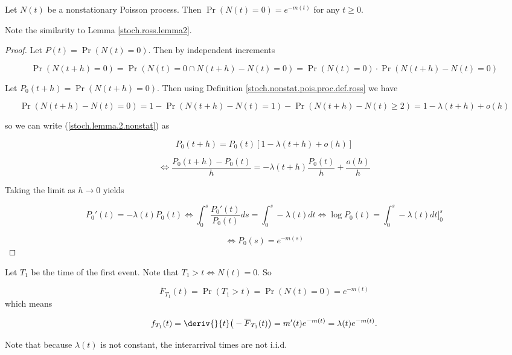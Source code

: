 \begin{lemma}\label{stoch.ross.nonstat.lemma2} Let \(N(t)\) be a nonstationary Poisson process. Then \(\Pr(N(t) = 0) =e^{-m(t)} \) for any \(t \geq 0\).

\end{lemma}

\begin{remark}Note the similarity to Lemma \ref{stoch.ross.lemma2}. \end{remark}

\begin{proof} Let \(P(t) = \Pr(N(t) = 0)\). Then by independent increments

\begin{equation}\label{stoch.lemma.2.nonstat}
\Pr(N(t+h) = 0) = \Pr(N(t) = 0 \cap N(t+h) - N(t) = 0) = \Pr(N(t) = 0) \cdot \Pr(N(t+h) - N(t) = 0)
\end{equation}

Let \(P_0(t+h) = \Pr(N(t+h) = 0)\). Then using Definition \ref{stoch.nonstat.pois.proc.def.ross} we have

\[
\Pr(N(t+h) - N(t) = 0 )= 1 - \Pr(N(t+h) - N(t) = 1 ) - \Pr(N(t+h) - N(t) \geq 2 ) = 1 - \lambda(t + h) + o(h)
\] 

so we can write (\ref{stoch.lemma.2.nonstat}) as 

\[
P_0(t+h) = P_0(t) [1 - \lambda(t + h) + o(h)]
\]

\[
\iff \frac{P_0(t+h) - P_0(t)}{h} = - \lambda(t + h) \frac{ P_0(t)}{h} + \frac{o(h)}{h}
\]

Taking the limit as \(h \to 0\) yields

\[
P_0'(t) = - \lambda(t) P_0(t) \iff \int_0^s \frac{P_0'(t)}{P_0(t)} ds = \int_0^s -\lambda(t) dt \iff \log P_0(t) = \int_0^s -\lambda(t) dt\bigg]_0^s
\]

\[
\iff P_0(s) = e^{- m(s)}
\]

\end{proof}

\begin{remark} Let \(T_1\) be the time of the first event. Note that \(T_1 > t \iff N(t) =0\). So 

\[
\overline{F}_{T_1}(t) = \Pr(T_1 > t) = \Pr(N(t) = 0) = e^{-m(t)}
\]
which means

\[
f_{T_1}(t) = \deriv{ }{t} \big( -\overline{F}_{T_1}(t) \big)  =  m'(t) e^{-m(t)} =  \lambda(t) e^{-m(t)}.
\]
\end{remark}

Note that because \(\lambda(t)\) is not constant, the interarrival times are not i.i.d.

